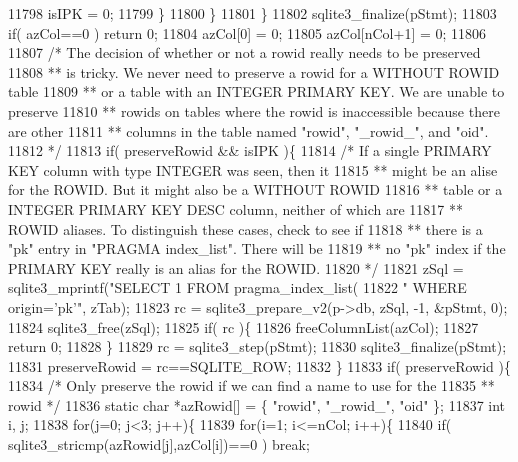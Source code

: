 \begin{DoxyCode}
{{11798         isIPK = 0;
11799       \}
11800     \}
11801   \}
11802   sqlite3_finalize(pStmt);
11803   \textcolor{keywordflow}{if}( azCol==0 ) \textcolor{keywordflow}{return} 0;
11804   azCol[0] = 0;
11805   azCol[nCol+1] = 0;
11806 
11807   \textcolor{comment}{/* The decision of whether or not a rowid really needs to be preserved}
11808 \textcolor{comment}{  ** is tricky.  We never need to preserve a rowid for a WITHOUT ROWID table}
11809 \textcolor{comment}{  ** or a table with an INTEGER PRIMARY KEY.  We are unable to preserve}
11810 \textcolor{comment}{  ** rowids on tables where the rowid is inaccessible because there are other}
11811 \textcolor{comment}{  ** columns in the table named "rowid", "\_rowid\_", and "oid".}
11812 \textcolor{comment}{  */}
11813   \textcolor{keywordflow}{if}( preserveRowid && isIPK )\{
11814     \textcolor{comment}{/* If a single PRIMARY KEY column with type INTEGER was seen, then it}
11815 \textcolor{comment}{    ** might be an alise for the ROWID.  But it might also be a WITHOUT ROWID}
11816 \textcolor{comment}{    ** table or a INTEGER PRIMARY KEY DESC column, neither of which are}
11817 \textcolor{comment}{    ** ROWID aliases.  To distinguish these cases, check to see if}
11818 \textcolor{comment}{    ** there is a "pk" entry in "PRAGMA index\_list".  There will be}
11819 \textcolor{comment}{    ** no "pk" index if the PRIMARY KEY really is an alias for the ROWID.}
11820 \textcolor{comment}{    */}
11821     zSql = sqlite3_mprintf(\textcolor{stringliteral}{"SELECT 1 FROM pragma\_index\_list(%
11822                            \textcolor{stringliteral}{" WHERE origin='pk'"}, zTab);
11823     rc = sqlite3_prepare_v2(p->db, zSql, -1, &pStmt, 0);
11824     sqlite3_free(zSql);
11825     \textcolor{keywordflow}{if}( rc )\{
11826       freeColumnList(azCol);
11827       \textcolor{keywordflow}{return} 0;
11828     \}
11829     rc = sqlite3_step(pStmt);
11830     sqlite3_finalize(pStmt);
11831     preserveRowid = rc==SQLITE_ROW;
11832   \}
11833   \textcolor{keywordflow}{if}( preserveRowid )\{
11834     \textcolor{comment}{/* Only preserve the rowid if we can find a name to use for the}
11835 \textcolor{comment}{    ** rowid */}
11836     \textcolor{keyword}{static} \textcolor{keywordtype}{char} *azRowid[] = \{ \textcolor{stringliteral}{"rowid"}, \textcolor{stringliteral}{"\_rowid\_"}, \textcolor{stringliteral}{"oid"} \};
11837     \textcolor{keywordtype}{int} i, j;
11838     \textcolor{keywordflow}{for}(j=0; j<3; j++)\{
11839       \textcolor{keywordflow}{for}(i=1; i<=nCol; i++)\{
11840         \textcolor{keywordflow}{if}( sqlite3_stricmp(azRowid[j],azCol[i])==0 ) \textcolor{keywordflow}{break};
}}}
\end{DoxyCode}
